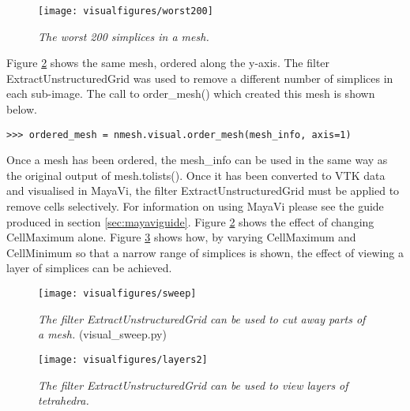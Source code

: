 \begin{figure}
\begin{center}
\texttt{[image: visualfigures/worst200]}
\caption{{\em The worst 200 simplices in a mesh.} \label{fig:worst200}}
\end{center}
\end{figure}


Figure \ref{fig:sweep} shows the same mesh, ordered along the y-axis. The filter ExtractUnstructuredGrid was used to remove a different number of simplices in each sub-image. The call to {\ttfamily order\_mesh()} which created this mesh is shown below.
\begin{lstlisting}[basicstyle=\small\ttfamily]
>>> ordered_mesh = nmesh.visual.order_mesh(mesh_info, axis=1)
\end{lstlisting}

Once a mesh has been ordered, the {\ttfamily mesh\_info} can be used in the same way as the original output of {\ttfamily mesh.tolists()}. Once it has been converted to VTK data and visualised in MayaVi, the filter ExtractUnstructuredGrid must be applied to remove cells selectively. For information on using MayaVi please see the guide produced in section \ref{sec:mayaviguide}. Figure \ref{fig:sweep} shows the effect of changing {\ttfamily CellMaximum} alone. Figure \ref{fig:sweep2} shows how, by varying {\ttfamily CellMaximum} and {\ttfamily CellMinimum} so that a narrow range of simplices is shown, the effect of viewing a layer of simplices can be achieved.


\newpage
\begin{landscape}
\begin{figure}
\begin{center}
\texttt{[image: visualfigures/sweep]}
\caption{{\em The filter ExtractUnstructuredGrid can be used to cut away parts of a mesh.} (visual\_sweep.py) \label{fig:sweep}}
\end{center}
\end{figure}
\end{landscape}

\newpage
\begin{landscape}
\begin{figure}
\begin{center}
\texttt{[image: visualfigures/layers2]}
\caption{{\em The filter ExtractUnstructuredGrid can be used to view layers of tetrahedra.} \label{fig:sweep2}}
\end{center}
\end{figure}
\end{landscape}




